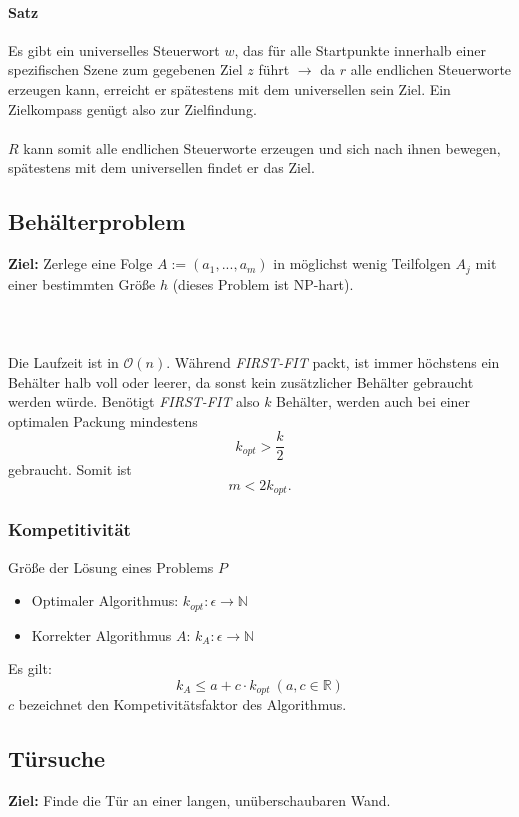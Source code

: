 \paragraph{Satz}
Es gibt ein universelles Steuerwort \(w\), das für alle Startpunkte innerhalb einer spezifischen Szene zum gegebenen Ziel \(z\) führt \(\rightarrow \) da \(r\) alle endlichen Steuerworte erzeugen kann, erreicht er spätestens mit dem universellen sein Ziel. Ein Zielkompass genügt also zur Zielfindung.
\\\\
\(R\) kann somit alle endlichen Steuerworte erzeugen und sich nach ihnen bewegen, spätestens mit dem universellen findet er das Ziel.


\subsection{Behälterproblem}
\textbf{Ziel:} Zerlege eine Folge \(A := (a_1,...,a_m)\) in möglichst wenig Teilfolgen \(A_j\) mit einer bestimmten Größe \(h\) (dieses Problem ist NP-hart).
\text{}\\\\

\text{}\\\\
Die Laufzeit ist in \(\mathcal{O}(n)\). Während \textit{FIRST-FIT} packt, ist immer höchstens ein Behälter halb voll oder leerer, da sonst kein zusätzlicher Behälter gebraucht werden würde. Benötigt \textit{FIRST-FIT} also \(k\) Behälter, werden auch bei einer optimalen Packung mindestens
\[k_{opt} > \frac{k}{2}\]
gebraucht. Somit ist
\[m < 2k_{opt}.\]

\subsubsection{Kompetitivität}
Größe der Lösung eines Problems \(P\)
\begin{itemize}
	\item Optimaler Algorithmus: \(k_{opt}: \epsilon \rightarrow \mathbb{N}\)
	\item Korrekter Algorithmus \(A\): \(k_A: \epsilon \rightarrow \mathbb{N}\)
\end{itemize}
Es gilt:
\[k_A \leq a+c\cdot k_{opt}~(a,c \in \mathbb{R})\]
\(c\) bezeichnet den Kompetivitätsfaktor des Algorithmus.


\subsection{Türsuche}
\textbf{Ziel:} Finde die Tür an einer langen, unüberschaubaren Wand.
\text{}\\



